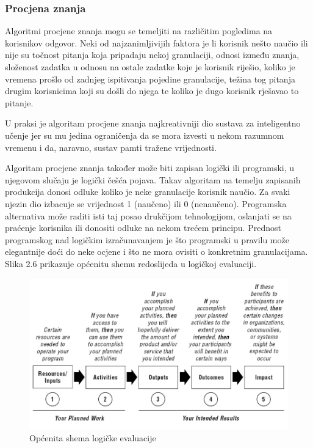 \documentclass[times, utf8, zavrsni, numeric]{fer}
\begin{document}
\subsubsection{Procjena znanja}
Algoritmi procjene znanja mogu se temeljiti na različitim pogledima na korisnikov odgovor. Neki od najzanimljivijih faktora je li korisnik nešto naučio ili nije su točnost pitanja koja pripadaju nekoj granulaciji, odnosi između znanja, složenost zadatka u odnosu na ostale zadatke koje je korisnik riješio, koliko je vremena prošlo od zadnjeg ispitivanja pojedine granulacije, težina tog pitanja drugim korisnicima koji su došli do njega te koliko je dugo korisnik rješavao to pitanje.
\par
U praksi je algoritam procjene znanja najkreativniji dio sustava za inteligentno učenje jer su mu jedina ograničenja da se mora izvesti u nekom razumnom vremenu i da, naravno, sustav pamti tražene vrijednosti.
\par
Algoritam procjene znanja također može biti zapisan logički ili programski, u njegovom slučaju je logički češća pojava. Takav algoritam na temelju zapisanih produkcija donosi odluke koliko je neke granulacije korisnik naučio. Za svaki njezin dio izbacuje se vrijednost 1 (naučeno) ili 0 (nenaučeno). Programska alternativa može raditi isti taj posao drukčijom tehnologijom, oslanjati se na praćenje korisnika ili donositi odluke na nekom trećem principu. Prednost programskog nad logičkim izračunavanjem je što programski u pravilu može elegantnije doći do neke ocjene i što ne mora ovisiti o konkretnim granulacijama. Slika 2.6 prikazuje općenitu shemu redoslijeda u logičkoj evaluaciji.

\begin{figure}[htb]
	\centering
	\includegraphics[]{img/logic.jpg}
	\caption{Općenita shema logičke evaluacije\citep{logicalevalpic}}
	\label{fig:logic_eval}
\end{figure}
\end{document}
